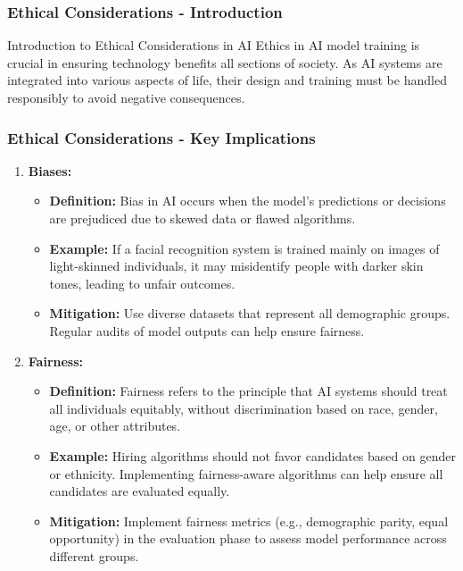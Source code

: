 \documentclass{beamer}
\begin{document}
\begin{frame}[fragile]
    \frametitle{Ethical Considerations - Introduction}
    \begin{block}{Introduction to Ethical Considerations in AI}
        Ethics in AI model training is crucial in ensuring technology benefits all sections of society. 
        As AI systems are integrated into various aspects of life, their design and training must be handled responsibly to avoid negative consequences.
    \end{block}
\end{frame}

\begin{frame}[fragile]
    \frametitle{Ethical Considerations - Key Implications}
    \begin{enumerate}
        \item \textbf{Biases:}
        \begin{itemize}
            \item \textbf{Definition:} Bias in AI occurs when the model's predictions or decisions are prejudiced due to skewed data or flawed algorithms.
            \item \textbf{Example:} If a facial recognition system is trained mainly on images of light-skinned individuals, it may misidentify people with darker skin tones, leading to unfair outcomes.
            \item \textbf{Mitigation:} Use diverse datasets that represent all demographic groups. Regular audits of model outputs can help ensure fairness.
        \end{itemize}

        \item \textbf{Fairness:}
        \begin{itemize}
            \item \textbf{Definition:} Fairness refers to the principle that AI systems should treat all individuals equitably, without discrimination based on race, gender, age, or other attributes.
            \item \textbf{Example:} Hiring algorithms should not favor candidates based on gender or ethnicity. Implementing fairness-aware algorithms can help ensure all candidates are evaluated equally.
            \item \textbf{Mitigation:} Implement fairness metrics (e.g., demographic parity, equal opportunity) in the evaluation phase to assess model performance across different groups.
        \end{itemize}


\end{enumerate}
\end{frame}
\end{document}
